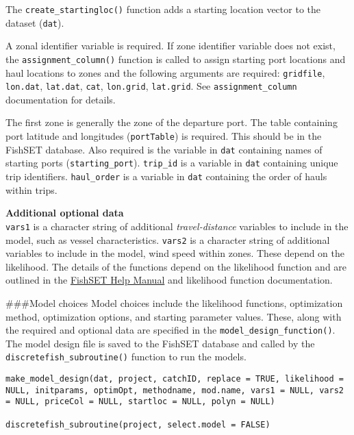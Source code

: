 \documentclass[
]{article}
\begin{document}
The \texttt{create\_startingloc()} function adds a starting location vector to the dataset (\texttt{dat}).

A zonal identifier variable is required. If zone identifier variable does not exist, the \texttt{assignment\_column()} function is called to assign starting port locations and haul locations to zones and the following arguments are required: \texttt{gridfile}, \texttt{lon.dat}, \texttt{lat.dat}, \texttt{cat}, \texttt{lon.grid}, \texttt{lat.grid}. See \texttt{assignment\_column} documentation for details.

The first zone is generally the zone of the departure port. The table containing port latitude and longitudes (\texttt{portTable}) is required. This should be in the FishSET database. Also required is the variable in \texttt{dat} containing names of starting ports (\texttt{starting\_port}). \texttt{trip\_id} is a variable in \texttt{dat} containing unique trip identifiers. \texttt{haul\_order} is a variable in \texttt{dat} containing the order of hauls within trips.

\textbf{Additional optional data}\\
\texttt{vars1} is a character string of additional \emph{travel-distance} variables to include in the model, such as vessel characteristics. \texttt{vars2} is a character string of additional variables to include in the model, wind speed within zones. These depend on the likelihood. The details of the functions depend on the likelihood function and are outlined in the \href{LINK1!}{FishSET Help Manual} and likelihood function documentation.

\#\#\#Model choices
Model choices include the likelihood functions, optimization method, optimization options, and starting parameter values. These, along with the required and optional data are specified in the \texttt{model\_design\_function()}. The model design file is saved to the FishSET database and called by the \texttt{discretefish\_subroutine()} function to run the models.

\begin{verbatim}
make_model_design(dat, project, catchID, replace = TRUE, likelihood = NULL, initparams, optimOpt, methodname, mod.name, vars1 = NULL, vars2 = NULL, priceCol = NULL, startloc = NULL, polyn = NULL)

discretefish_subroutine(project, select.model = FALSE)
\end{verbatim}
\end{document}
